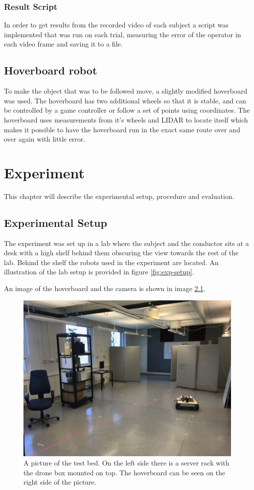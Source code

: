 \documentclass[nofilelist]{cslthse-msc}
\begin{document}
\subsection{Result Script}
In order to get results from the recorded video of each subject a script was implemented that was run on each trial, measuring the error of the operator in each video frame and saving it to a file.

\section{Hoverboard robot}
To make the object that was to be followed move, a slightly modified hoverboard was used. The hoverboard has two additional wheels so that it is stable, and can be controlled by a game controller or follow a set of points using coordinates. The hoverboard uses measurements from it's wheels and LIDAR to locate itself which makes it possible to have the hoverboard run in the exact same route over and over again with little error. 

\chapter{Experiment}
This chapter will describe the experimental setup, procedure and evaluation.

\section{Experimental Setup}
The experiment was set up in a lab where the subject and the conductor sits at a desk with a high shelf behind them obscuring the view towards the rest of the lab. Behind the shelf the robots used in the experiment are located. An illustration of the lab setup is provided in figure \ref{fig:exp-setup}. 

An image of the hoverboard and the camera is shown in image \ref{fig:real-exp}.

\begin{figure}[!hbt]
   \centering
   \includegraphics[scale=0.1]{images/testbed.jpg} 
   \caption{A picture of the test bed. On the left side there is a server rack with the drone box mounted on top. The hoverboard can be seen on the right side of the picture.}
   \label{fig:real-exp}
\end{figure}
\end{document}
